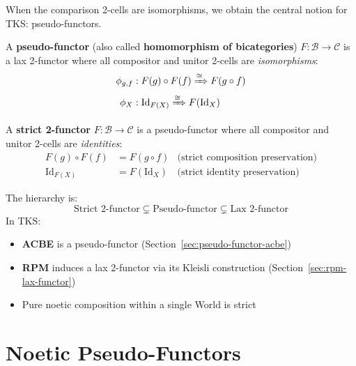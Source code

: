 When the comparison 2-cells are isomorphisms, we obtain the central notion
for TKS: pseudo-functors.

\begin{definition}
\label{def:pseudo-functor}
A \textbf{pseudo-functor} (also called \textbf{homomorphism of bicategories})
$F : \mathcal{B} \to \mathcal{C}$ is a lax 2-functor where all compositor and
unitor 2-cells are \emph{isomorphisms}:
\begin{align*}
  \phi_{g,f} &: F(g) \circ F(f) \xRightarrow{\cong} F(g \circ f) \\
  \phi_X &: \mathrm{Id}_{F(X)} \xRightarrow{\cong} F(\mathrm{Id}_X)
\end{align*}
\end{definition}

\begin{definition}
\label{def:strict-2-functor}
A \textbf{strict 2-functor} $F : \mathcal{B} \to \mathcal{C}$ is a pseudo-functor
where all compositor and unitor 2-cells are \emph{identities}:
\begin{align*}
  F(g) \circ F(f) &= F(g \circ f) & \text{(strict composition preservation)} \\
  \mathrm{Id}_{F(X)} &= F(\mathrm{Id}_X) & \text{(strict identity preservation)}
\end{align*}
\end{definition}

\begin{remark}
\label{rem:2-functor-hierarchy}
The hierarchy is:
\[
  \text{Strict 2-functor} \subsetneq \text{Pseudo-functor} \subsetneq \text{Lax 2-functor}
\]
In TKS:
\begin{itemize}
  \item \textbf{ACBE} is a pseudo-functor (Section~\ref{sec:pseudo-functor-acbe})
  \item \textbf{RPM} induces a lax 2-functor via its Kleisli construction (Section~\ref{sec:rpm-lax-functor})
  \item Pure noetic composition within a single World is strict
\end{itemize}
\end{remark}

\section{Noetic Pseudo-Functors}
\label{sec:noetic-pseudo-functors}


